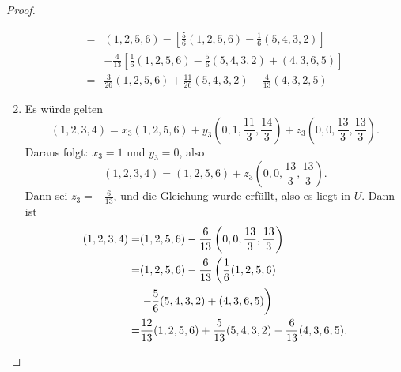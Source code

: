 \begin{proof}
\begin{parts}
\begin{enumerate}[label=(\arabic*)]
\begin{align*}
		=&(1,2,5,6)-\left[ \frac{5}{6}(1,2,5,6)-\frac{1}{6}(5,4,3,2) \right] \\
		&-\frac{4}{13}\left[ \frac{1}{6}(1,2,5,6)-\frac{5}{6}(5,4,3,2)+(4,3,6,5) \right]\\
		=&\frac{3}{26}(1,2,5,6)+\frac{11}{26}(5,4,3,2)-\frac{4}{13}(4,3,2,5)
	\end{align*}
\item Es würde gelten
	\[
		(1,2,3,4)=x_3(1,2,5,6)+y_3\left( 0,1,\frac{11}{3},\frac{14}{3} \right) +z_3\left( 0,0,\frac{13}{3},\frac{13}{3} \right) 
	.\] 
	Daraus folgt: $x_3=1$ und $y_3=0$, also
	\[
		(1,2,3,4)=(1,2,5,6)+z_3\left( 0,0,\frac{13}{3},\frac{13}{3} \right) 
	.\] 
	Dann sei $z_3=-\frac{6}{13}$, und die Gleichung wurde erfüllt, also es liegt in $U$. Dann ist
	\begin{align*}
		(1,2,3,4)=&(1,2,5,6)-\frac{6}{13}\left( 0,0,\frac{13}{3},\frac{13}{3} \right) \\
		=&(1,2,5,6)-\frac{6}{13}\left( \frac{1}{6}(1,2,5,6)\right.\\
		 &\left.-\frac{5}{6}(5,4,3,2)+(4,3,6,5)\right)\\
		=&\frac{12}{13}(1,2,5,6)+\frac{5}{13}(5,4,3,2)-\frac{6}{13}(4,3,6,5).\qedhere
	\end{align*}
	\end{enumerate}
\end{parts}
\end{proof}

